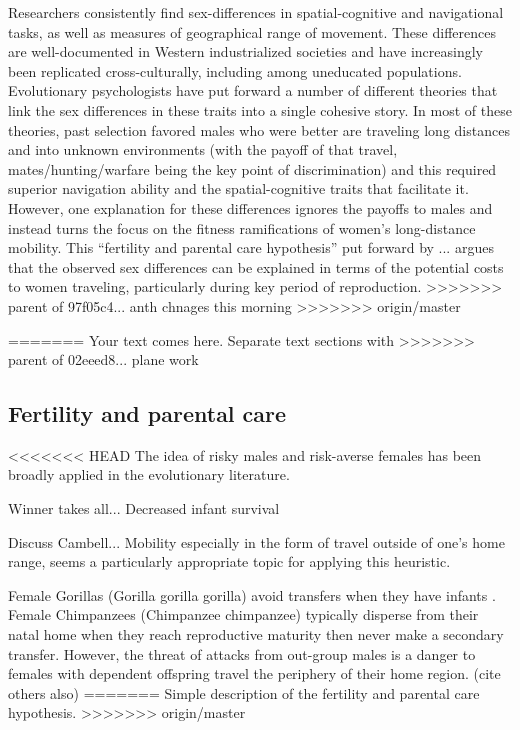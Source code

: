 Researchers consistently find sex-differences in spatial-cognitive and navigational tasks, as well as measures of geographical range of movement.  These differences are well-documented in Western industrialized societies and have increasingly been replicated cross-culturally, including among uneducated populations.  Evolutionary psychologists have put forward a number of different theories that link the sex differences in these traits into a single cohesive story.  In most of these theories, past selection favored males who were better are traveling long distances and into unknown environments (with the payoff of that travel, mates/hunting/warfare being the key point of discrimination) and this required superior navigation ability and the spatial-cognitive traits that facilitate it.  However, one explanation for these differences ignores the payoffs to males and instead turns the focus on the fitness ramifications of women's long-distance mobility.  This ``fertility and parental care hypothesis'' put forward by ... argues that the observed sex differences can be explained in terms of the potential costs to women traveling, particularly during key period of reproduction.
>>>>>>> parent of 97f05c4... anth chnages this morning
>>>>>>> origin/master

=======
Your text comes here. Separate text sections with
>>>>>>> parent of 02eeed8... plane work
	\subsection{Fertility and parental care}
	\label{sec:1.1}
<<<<<<< HEAD
The idea of risky males and risk-averse females has been broadly applied in the evolutionary literature.

Winner takes all...  Decreased infant survival \cite{hill1996ache, sear2008keeps} 

Discuss Cambell... Mobility especially in the form of travel outside of one's home range, seems a particularly appropriate topic for applying this heuristic.  

Female Gorillas (Gorilla gorilla gorilla) avoid transfers when they have infants \cite{watts1989infanticide, stokes2003female}.  Female Chimpanzees (Chimpanzee chimpanzee) typically disperse from their natal home when they reach reproductive maturity then never make a secondary transfer.  However, the threat of attacks from out-group males is a danger to females with dependent offspring travel the periphery of their home region. \cite{mitani2002recent, watts1989infanticide} (cite others also)
=======
Simple description of the fertility and parental care hypothesis.
>>>>>>> origin/master

